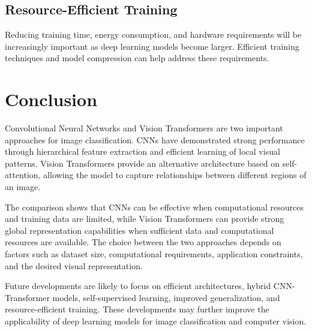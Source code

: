 \documentclass[conference]{IEEEtran}
\begin{document}
\subsection{Resource-Efficient Training}

Reducing training time, energy consumption, and hardware requirements will be increasingly important as deep learning models become larger. Efficient training techniques and model compression can help address these requirements.

\section{Conclusion}

Convolutional Neural Networks and Vision Transformers are two important approaches for image classification. CNNs have demonstrated strong performance through hierarchical feature extraction and efficient learning of local visual patterns. Vision Transformers provide an alternative architecture based on self-attention, allowing the model to capture relationships between different regions of an image.

The comparison shows that CNNs can be effective when computational resources and training data are limited, while Vision Transformers can provide strong global representation capabilities when sufficient data and computational resources are available. The choice between the two approaches depends on factors such as dataset size, computational requirements, application constraints, and the desired visual representation.

Future developments are likely to focus on efficient architectures, hybrid CNN-Transformer models, self-supervised learning, improved generalization, and resource-efficient training. These developments may further improve the applicability of deep learning models for image classification and computer vision.
\end{document}
